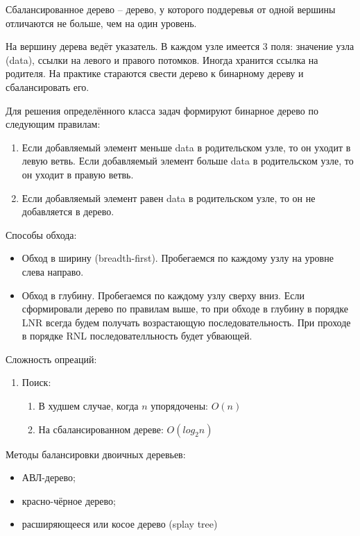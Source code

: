 \documentclass{article}
\begin{document}
Сбалансированное дерево -- дерево, у которого поддеревья от одной вершины отличаются не больше, чем на один уровень.

На вершину дерева ведёт указатель. В каждом узле имеется 3 поля: значение узла (data), ссылки на левого и правого потомков. Иногда хранится ссылка на родителя.
На практике стараются свести дерево к бинарному дереву и сбалансировать его.

Для решения определённого класса задач формируют бинарное дерево по следующим правилам:
\begin{enumerate}
    \item Если добавляемый элемент меньше data в родительском узле, то он уходит в левую ветвь.
Если добавляемый элемент больше data в родительском узле, то он уходит в правую ветвь.
    \item Если добавляемый элемент равен data в родительском узле, то он не добавляется в дерево.
\end{enumerate}

Способы обхода:
\begin{itemize}
    \item Обход в ширину (breadth-first). Пробегаемся по каждому узлу на уровне слева направо.
    \item Обход в глубину. Пробегаемся по каждому узлу сверху вниз. Если сформировали дерево по правилам выше, то
при обходе в глубину в порядке LNR всегда будем получать возрастающую последовательность. При проходе в порядке RNL
последователльность будет убвающей.
\end{itemize}

Сложность опреаций:
\begin{enumerate}
    \item Поиск:
    \begin{enumerate}
        \item В худшем случае, когда $n$ упорядочены: $O(n)$
        \item На сбалансированном дереве: $O(log_2 n)$
    \end{enumerate}
\end{enumerate}

Методы балансировки двоичных деревьев:
\begin{itemize}
    \item АВЛ-дерево;
    \item красно-чёрное дерево;
    \item расширяющееся или косое дерево (splay tree)
\end{itemize}
\end{document}
